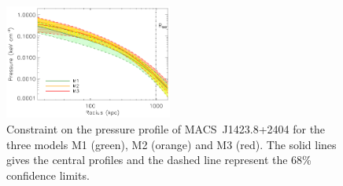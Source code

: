 \documentclass[twocolumn,traditabstract]{aa}
\providecommand{\DIFaddbeginFL}{} %
\providecommand{\DIFaddendFL}{} %
\begin{document}
\begin{figure}[h]
\centering
\includegraphics[width=0.49\textwidth]{Figure/ICM_pressure_profile_point_sources.pdf}
\caption{\DIFaddbeginFL \footnotesize \DIFaddendFL Constraint on the pressure profile of \mbox{MACS~J1423.8+2404} for the three models M1 (green), M2 (orange) and M3 (red). The solid lines gives the central profiles and the dashed line represent the 68\% confidence limits.}
\label{fig:MACSJ1424_pressure_point_source}
\end{figure}
\end{document}
